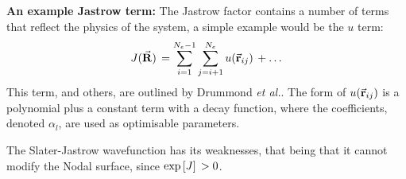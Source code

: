 \documentclass[10pt]{beamer}
\begin{document}
\begin{frame}[allowframebreaks]
    \textbf{An example Jastrow term:}\medskip\newline
    The Jastrow factor contains a number of terms that reflect the physics of the system, a simple example would be the $u$ term:
    \begin{equation}
        J\pqty*{\va{R}}=\sum_{i=1}^{N_e-1}\sum_{j=i+1}^{N_e}u\pqty*{\va{r}_{ij}}+\ldots
    \end{equation}
    This term, and others, are outlined by Drummond \textit{et al.}\cite{Drummond2004}.\medskip\newline
    The form of $u\pqty{\va{r}_{ij}}$ is a polynomial plus a constant term with a decay function, where the coefficients, denoted $\alpha_l$, are used as optimisable parameters.
    \framebreak%

    The Slater-Jastrow wavefunction has its weaknesses, that being that it cannot modify the Nodal surface, since $\exp\bqty*{J}>0$.
\end{frame}
\end{document}
